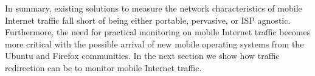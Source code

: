 In summary, existing solutions to measure the network characteristics of mobile Internet traffic fall short of being either portable, pervasive, or ISP agnostic. 
Furthermore, the need for practical monitoring on mobile Internet traffic becomes more critical with the possible arrival of new mobile operating systems from the Ubuntu and Firefox communities.
In the next section we show how traffic redirection can be to monitor mobile Internet traffic. 


